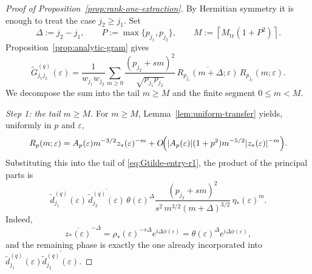 \documentclass[11pt]{amsart}
\numberwithin{equation}{section}
\theoremstyle{plain}
\theoremstyle{definition}
\theoremstyle{remark}
\begin{document}
\begin{proof}[Proof of Proposition~\ref{prop:rank-one-extraction}]
By Hermitian symmetry it is enough to treat the case \(j_2\ge j_1\). Set
\[
\Delta:=j_2-j_1,
\qquad
P:=\max\{p_{j_1},p_{j_2}\},
\qquad
M:=\left\lceil M_{\mathrm{tr}}(1+P^2)\right\rceil .
\]
Proposition~\ref{prop:analytic-gram} gives
\begin{equation}\label{eq:Gtilde-entry-r1}
\widetilde G^{(q)}_{j_1j_2}(\varepsilon)
=
\frac{1}{w_{j_1}w_{j_2}}
\sum_{m\ge0}
\frac{(p_{j_2}+sm)^2}{\sqrt{p_{j_1}p_{j_2}}}\,
\overline{R_{p_{j_1}}(m+\Delta;\varepsilon)}\,
R_{p_{j_2}}(m;\varepsilon).
\end{equation}
We decompose the sum into the tail \(m\ge M\) and the finite segment
\(0\le m<M\).

\smallskip
\noindent
\textit{Step 1: the tail \(m\ge M\).}
For \(m\ge M\), Lemma~\ref{lem:uniform-transfer} yields, uniformly in \(p\) and
\(\varepsilon\),
\[
R_p(m;\varepsilon)
=
A_p(\varepsilon)m^{-3/2}z_*(\varepsilon)^{-m}
+
O\!\Bigl(
|A_p(\varepsilon)|(1+p^2)m^{-5/2}|z_*(\varepsilon)|^{-m}
\Bigr).
\]
Substituting this into the tail of \eqref{eq:Gtilde-entry-r1}, the product of
the principal parts is
\[
\widetilde d^{(q)}_{j_1}(\varepsilon)\,
\overline{\widetilde d^{(q)}_{j_2}(\varepsilon)}\,
\theta(\varepsilon)^\Delta
\frac{(p_{j_2}+sm)^2}{s^2\,m^{3/2}(m+\Delta)^{3/2}}\,
\eta_*(\varepsilon)^m .
\]
Indeed,
\[
\overline{z_*(\varepsilon)}^{-\Delta}
=
\rho_*(\varepsilon)^{-s\Delta}e^{i\Delta\phi(\varepsilon)}
=
\theta(\varepsilon)^\Delta e^{i\Delta\phi(\varepsilon)},
\]
and the remaining phase is exactly the one already incorporated into
\(
\widetilde d^{(q)}_{j_1}(\varepsilon)
\overline{\widetilde d^{(q)}_{j_2}(\varepsilon)}
\).


\end{proof}
\end{document}
